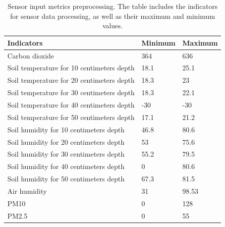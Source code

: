 \documentclass[acmsmall, screen]{acmart}
\begin{document}
\begin{table}
  \caption{Sensor input metrics preprocessing. The table includes the indicators for sensor data processing, as well as their maximum and minimum values. \label{tab:sensor_input_metrics_preprocessing}}

  \begin{tabular}{lll}
    \hline
    \multicolumn{1}{l}{Indicators}            & \multicolumn{1}{l}{Minimum} & \multicolumn{1}{l}{Maximum} \\
    \hline
    Carbon dioxide                            & 364                         & 636                         \\
    Soil temperature for 10 centimeters depth & 18.1                        & 25.1                        \\
    Soil temperature for 20 centimeters depth & 18.3                        & 23                          \\
    Soil temperature for 30 centimeters depth & 18.3                        & 22.1                        \\
    Soil temperature for 40 centimeters depth & -30                         & -30                         \\
    Soil temperature for 50 centimeters depth & 17.1                        & 21.2                        \\
    Soil humidity for 10 centimeters depth    & 46.8                        & 80.6                        \\
    Soil humidity for 20 centimeters depth    & 53                          & 75.6                        \\
    Soil humidity for 30 centimeters depth    & 55.2                        & 79.5                        \\
    Soil humidity for 40 centimeters depth    & 0                           & 80.6                        \\
    Soil humidity for 50 centimeters depth    & 67.3                        & 81.5                        \\
    Air humidity                              & 31                          & 98.53                       \\
    PM10                                      & 0                           & 128                         \\
    PM2.5                                     & 0                           & 55                          \\

\end{tabular}
\end{table}
\end{document}
